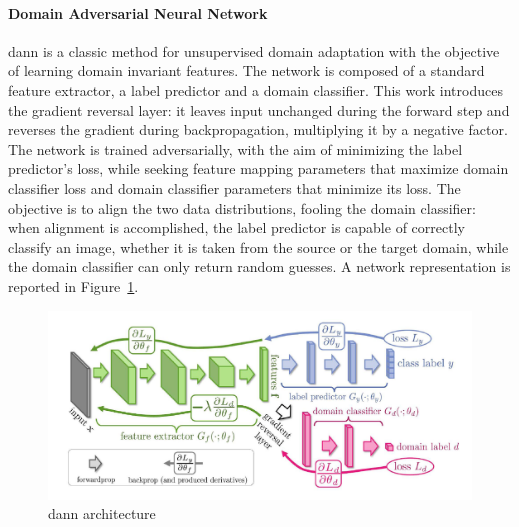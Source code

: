 \documentclass[%
    corpo=12pt,
    twoside,
    stile=classica,   
    tipotesi=magistrale,
    evenboxes,
    english
]{toptesi}
\begin{document}
\paragraph{Domain Adversarial Neural Network}\label{sec:dann}
\gls{dann}\cite{ganin2015unsupervised} is a classic method for un\-su\-per\-vi\-sed domain adaptation with the objective of learning domain invariant features. The network is composed of a standard feature extractor, a label predictor and a domain classifier. This work introduces the gradient reversal layer: it leaves input unchanged during the forward step and reverses the gradient during backpropagation, multiplying it by a negative factor. The network is trained adversarially, with the aim of minimizing the label predictor’s loss, while seeking feature mapping parameters that maximize domain classifier loss and domain classifier parameters that minimize its loss. The objective is to align the two data distributions, fooling the domain classifier: when alignment is accomplished, the label predictor is capable of correctly classify an image, whether it is taken from the source or the target domain, while the domain classifier can only return random guesses. A network representation is reported in Figure~\ref{fig:dann}.

\begin{figure}[ht!]
	\centering
	\includegraphics[width=0.7\linewidth]{imgs/dann.png}
	\caption{\gls{dann} architecture\cite{ganin2015unsupervised}}
	\label{fig:dann}
\end{figure}

\end{document}
